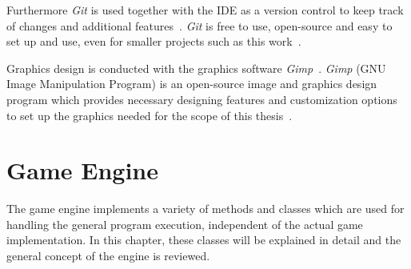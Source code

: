 Furthermore \textit{Git} is used together with the IDE as a version control to keep track of changes and additional
features~\cite{git}.
\textit{Git} is free to use, open-source and easy to set up and use, even for smaller projects such as this work~\cite{git}.

Graphics design is conducted with the graphics software \textit{Gimp}~\cite{gimp}.
\textit{Gimp} (GNU Image Manipulation Program) is an open-source image and graphics design program which provides
necessary designing features and customization options to set up the graphics needed for the scope of this thesis~\cite{gimp}.
\section{Game Engine}\label{sec:game}
The game engine implements a variety of methods and classes which are used for handling the general program execution, independent of the actual game implementation.
In this chapter, these classes will be explained in detail and the general concept of the engine is reviewed.

